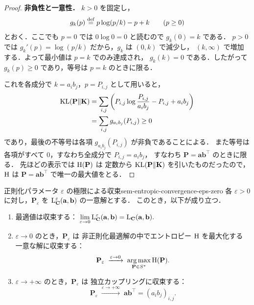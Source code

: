 \begin{proof}
  \textbf{非負性と一意性．}
  $k > 0$ を固定し，
  \[
    g_k(p) \overset{\mathrm{def}}{=} p\log(p/k) - p + k \qquad (p \geq 0)
  \]
  とおく．ここでも $p=0$ では $0\log0=0$ と読むので $g_k(0)=k$ である．
  $p>0$ では $g_k'(p)=\log(p/k)$ だから，$g_k$ は $(0,k)$ で減少し，
  $(k,\infty)$ で増加する．よって最小値は $p=k$ でのみ達成され，
  $g_k(k)=0$ である．したがって $g_k(p)\geq0$ であり，等号は $p=k$ のときに限る．

  これを各成分で $k=a_i b_j$，$p=P_{i,j}$ として用いると，
  \[
  \begin{aligned}
    \mathrm{KL}(\mathbf{P}\|\mathbf{K})
    &=
    \sum_{i,j}
    \left(
      P_{i,j}\log\frac{P_{i,j}}{a_i b_j}
      - P_{i,j}
      + a_i b_j
    \right) \\
    &=
    \sum_{i,j} g_{a_i b_j}(P_{i,j})
    \geq 0
  \end{aligned}
  \]
  であり，最後の不等号は各項 $g_{a_i b_j}(P_{i,j})$ が非負であることによる．
  また等号は各項がすべて $0$，すなわち全成分で $P_{i,j}=a_i b_j$，
  すなわち $\mathbf{P}=\mathbf{a}\mathbf{b}^\top$ のときに限る．
  先ほどの表示では $\mathrm{H}(\mathbf{P})$ は
  定数から $\mathrm{KL}(\mathbf{P}\|\mathbf{K})$ を引いたものだったので，
  $\mathrm{H}$ は $\mathbf{P} = \mathbf{a}\mathbf{b}^\top$ で唯一の最大値をとる．
\end{proof}

\begin{theorem}{正則化パラメータ $\varepsilon$ の極限による収束}{sem-entropic-convergence-eps-zero}
  各 $\varepsilon > 0$ に対し，$\mathbf{P}_\varepsilon$ を
  $\mathrm{L}_{\mathbf{C}}^\varepsilon(\mathbf{a}, \mathbf{b})$ の一意解とする．
  このとき，以下が成り立つ．

  \begin{enumerate}
    \item[(i)]
      最適値は収束する：
      $\displaystyle
        \lim_{\varepsilon \to 0}
        \mathrm{L}_{\mathbf{C}}^\varepsilon(\mathbf{a},\mathbf{b})
        =
        \mathrm{L}_{\mathbf{C}}(\mathbf{a},\mathbf{b}).
      $
    \item[(ii)]
      $\varepsilon \to 0$ のとき，$\mathbf{P}_\varepsilon$ は
      非正則化最適解の中でエントロピー $\mathrm{H}$ を最大化する
      一意な解に収束する：
      \[
        \mathbf{P}_\varepsilon
        \;\xrightarrow{\varepsilon \to 0}\;
        \operatorname*{arg\,max}_{\mathbf{P} \in S^*} \mathrm{H}(\mathbf{P}).
      \]
    \item[(iii)]
      $\varepsilon \to +\infty$ のとき，$\mathbf{P}_\varepsilon$ は
      独立カップリングに収束する：
      \[
        \mathbf{P}_\varepsilon
        \;\xrightarrow{\varepsilon \to +\infty}\;
        \mathbf{a}\mathbf{b}^\top = (a_i b_j)_{i,j}.
      \]
  \end{enumerate}
\end{theorem}

